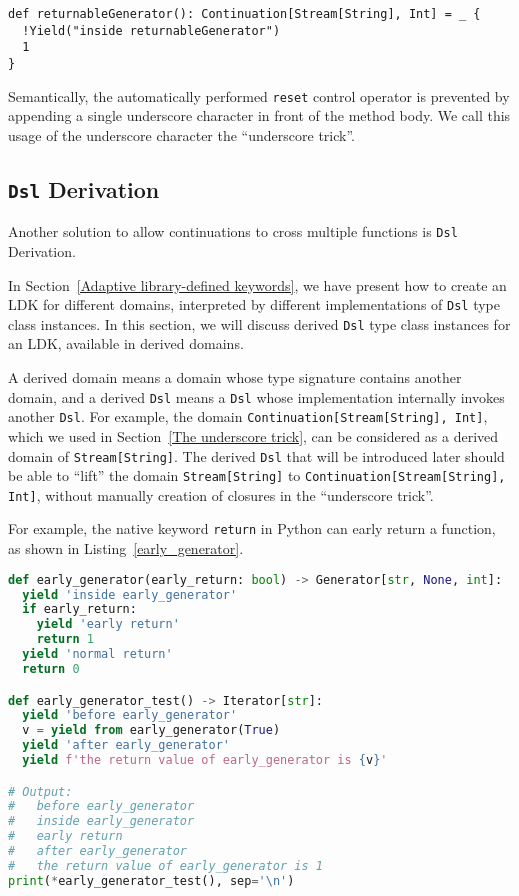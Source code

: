 \begin{lstlisting}[caption={Returning an additional value in LDK-based generators, written in the underscore trick},label={returnableGenerator-underscore}]
def returnableGenerator(): Continuation[Stream[String], Int] = _ {
  !Yield("inside returnableGenerator")
  1
}
\end{lstlisting}

Semantically, the automatically performed \lstinline{reset} control operator is prevented by appending a single underscore character in front of the method body. We call this usage of the underscore character the ``underscore trick''.

\subsection{\lstinline{Dsl} Derivation}\label{Composable delimited continuation}

Another solution to allow continuations to cross multiple functions is \lstinline{Dsl} Derivation.

In Section~\ref{Adaptive library-defined keywords}, we have present how to create an LDK for different domains, interpreted by different implementations of \lstinline{Dsl} type class instances. In this section, we will discuss derived \lstinline{Dsl} type class instances for an LDK, available in derived domains.

A derived domain means a domain whose type signature contains another domain, and a derived \lstinline{Dsl} means a \lstinline{Dsl} whose implementation internally invokes another \lstinline{Dsl}. For example, the domain \lstinline{Continuation[Stream[String], Int]}, which we used in Section~\ref{The underscore trick}, can be considered as a derived domain of \lstinline{Stream[String]}. The derived \lstinline{Dsl} that will be introduced later should be able to ``lift'' the domain \lstinline{Stream[String]} to \lstinline{Continuation[Stream[String], Int]}, without manually creation of closures in the ``underscore trick''.

For example, the native keyword \lstinline{return} in Python can early return a function, as shown in Listing~\ref{early_generator}.

\begin{lstlisting}[language=Python,style=Python3,caption={Use \lstinline{yield from} and \lstinline{return} in Python generators},label={early_generator}]
def early_generator(early_return: bool) -> Generator[str, None, int]:
  yield 'inside early_generator'
  if early_return:
    yield 'early return'
    return 1
  yield 'normal return'
  return 0

def early_generator_test() -> Iterator[str]:
  yield 'before early_generator'
  v = yield from early_generator(True)
  yield 'after early_generator'
  yield f'the return value of early_generator is {v}'

# Output:
#   before early_generator
#   inside early_generator
#   early return
#   after early_generator
#   the return value of early_generator is 1
print(*early_generator_test(), sep='\n')
\end{lstlisting}

